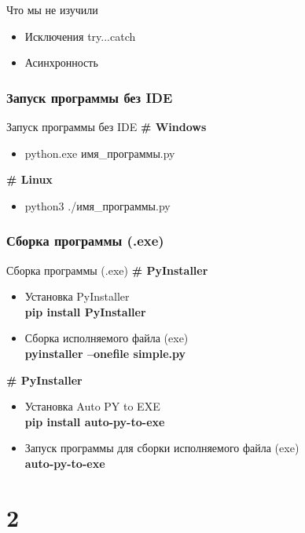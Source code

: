\documentclass[12pt]{beamer}
\begin{document}
\begin{frame}{Что мы не изучили}
\begin{itemize}
\item Исключения try...catch
\item Асинхронность
\end{itemize}
\end{frame}


\section{Запуск программы без IDE}
\begin{frame}{Запуск программы без IDE}
\textbf{\# Windows} 
\begin{itemize}
\item python.exe имя\_программы.py
\end{itemize}
\vspace{0.3cm}
\textbf{\# Linux} 
\begin{itemize}
\item python3 ./имя\_программы.py
\end{itemize}
\end{frame}

\section{Сборка программы (.exe)}
\begin{frame}{Сборка программы (.exe)}
\textbf{\# PyInstaller} 
\begin{itemize}
\item Установка PyInstaller \\
	\textbf{pip install PyInstaller }
\item Сборка исполняемого файла (exe) \\
	\textbf{pyinstaller --onefile simple.py}
\end{itemize}
\vspace{0.3cm}
\textbf{\# PyInstaller} 
\begin{itemize}
\item Установка Auto PY to EXE \\
	\textbf{pip install auto-py-to-exe }
\item Запуск программы для сборки исполняемого файла (exe) \\
	\textbf{auto-py-to-exe}
\end{itemize}
\end{frame}


\part{2}
\end{document}
